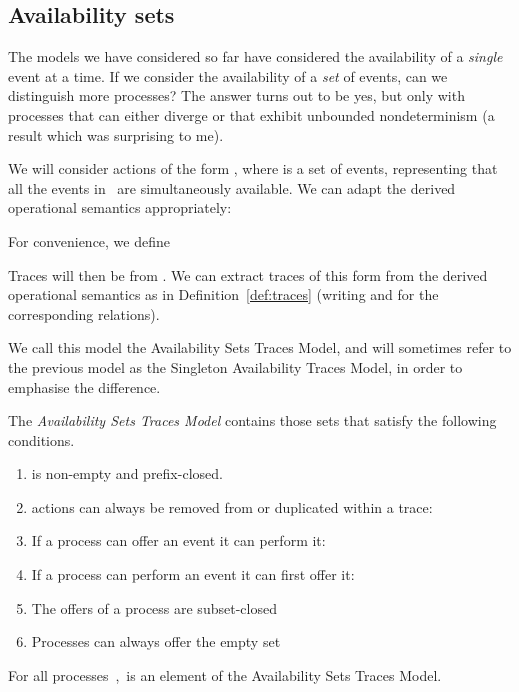 \subsection{Availability sets}
\label{sec:availSets}

The models we have considered so far have considered the availability of a
\emph{single} event at a time.  If we consider the availability of a
\emph{set} of events, can we distinguish more processes?  The answer turns out
to be yes, but only with processes that can either diverge or that exhibit
unbounded nondeterminism (a result which was surprising to me). 

We will consider actions of the form , where  is
a set of events, representing that all the events in~ are simultaneously
available.  We can adapt the derived operational semantics appropriately:



For convenience, we define

Traces will then be from .  We can extract traces
of this form from the derived operational semantics as in
Definition~\ref{def:traces} (writing  and
 for the corresponding relations).

We call this model the Availability Sets Traces Model, and will sometimes refer
to the previous model as the Singleton Availability Traces Model, in order to
emphasise the difference.
\begin{definition}
The \emph{Availability Sets Traces Model}  contains
those sets  that satisfy the
following conditions.
\begin{enumerate}
\item
 is non-empty and prefix-closed.

\item
\label{healthy:offer_duplicate-sets}
  actions can always be removed from or duplicated
within a trace:


\item
\label{healthy:offer_implies_event-sets}
If a process can offer an event it can perform it:


\item
\label{healthy:event_implies_offer-sets}
If a process can perform an event it can first offer it:


\item
The offers of a process are subset-closed


\item
Processes can always offer the empty set

\end{enumerate}
\end{definition}
\begin{lemma}
\label{lem:opsem-healthy-sets}
For all processes~,\,   is an
element of the Availability Sets Traces Model.
\end{lemma}





